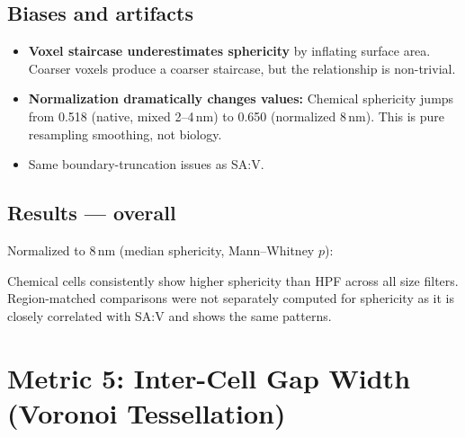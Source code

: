 \documentclass[times, twoside]{zHenriquesLab-StyleBioRxiv}
\begin{document}
\subsection*{Biases and artifacts}
\begin{itemize}[nosep]
\item \textbf{Voxel staircase underestimates sphericity} by inflating surface area. Coarser voxels produce a coarser staircase, but the relationship is non-trivial.
\item \textbf{Normalization dramatically changes values:} Chemical sphericity jumps from 0.518 (native, mixed 2--4\,nm) to 0.650 (normalized 8\,nm). This is pure resampling smoothing, not biology.
\item Same boundary-truncation issues as SA:V.
\end{itemize}

\subsection*{Results --- overall}

Normalized to 8\,nm (median sphericity, Mann--Whitney $p$):

\begin{table}[h]
\centering
{}
\end{table}

Chemical cells consistently show higher sphericity than HPF across all size filters. Region-matched comparisons were not separately computed for sphericity as it is closely correlated with SA:V and shows the same patterns.

\section*{Metric 5: Inter-Cell Gap Width (Voronoi Tessellation)}
\end{document}

